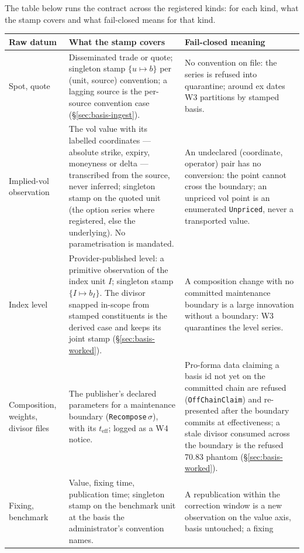The table below runs the contract across the registered kinds: for each kind, what
the stamp covers and what fail-closed means for that kind.

\renewcommand{\arraystretch}{1.15}
\begin{center}
\begin{longtable}{@{}p{2.4cm} p{5.6cm} p{5.5cm}@{}}
\toprule
\textbf{Raw datum} & \textbf{What the stamp covers} & \textbf{Fail-closed meaning} \\
\midrule
\endhead
Spot, quote & Disseminated trade or quote; singleton stamp $\{u\mapsto b\}$ per
(unit, source) convention; a lagging source is the per-source convention case
(\S\ref{sec:basis-ingest}). & No
convention on file: the series is refused into quarantine; around ex dates W3
partitions by stamped basis. \\
\addlinespace
Implied-vol observation & The vol value with its labelled coordinates --- absolute
strike, expiry, moneyness or delta --- transcribed from the source, never inferred;
singleton stamp on the quoted unit (the option series where registered, else the
underlying). No parametrisation is mandated.
& An undeclared (coordinate, operator) pair has no conversion: the point cannot cross the
boundary; an unpriced vol point is an enumerated \texttt{Unpriced}, never a
transported value. \\
\addlinespace
Index level & Provider-published level: a primitive observation of the index unit
$I$; singleton stamp $\{I\mapsto b_I\}$. The divisor snapped in-scope from stamped
constituents is the derived case and keeps its joint stamp
(\S\ref{sec:basis-worked}). & A composition change
with no committed maintenance boundary is a large innovation without a boundary: W3
quarantines the level series. \\
\addlinespace
Composition, weights, divisor files & The publisher's declared parameters for a
maintenance boundary (\texttt{Recompose}\,$\sigma$), with its $t_{\mathrm{eff}}$;
logged as a W4 notice. &
Pro-forma data claiming a basis id not yet on the committed chain are refused
(\texttt{OffChainClaim}) and re-presented after the boundary commits at
effectiveness; a stale divisor consumed across the boundary is the refused 70.83
phantom (\S\ref{sec:basis-worked}). \\
\addlinespace
Fixing, benchmark & Value, fixing time, publication time; singleton stamp on the
benchmark unit at the basis the administrator's convention names. & A republication
within the
correction window is a new observation on the value axis, basis untouched; a fixing

\end{longtable}
\end{center}
